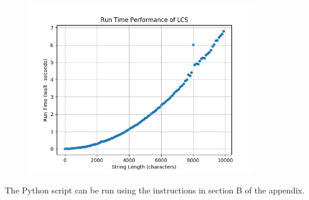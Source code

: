 \begin{figure}[h]
\centering
\includegraphics[width=10cm]{img/runtime_performance.png}
\end{figure}

The Python script can be run using the instructions in section B of the appendix.

\newpage